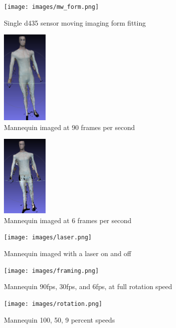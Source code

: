 \begin{figure}[!htb]
	\caption{Single d435 sensor moving imaging form fitting}
	\centering
	\texttt{[image: images/mw\_form.png]}
\end{figure}



\begin{figure}[!htb]
	\caption{Mannequin imaged at 90 frames per second}
	\centering
	\includegraphics[width=0.2\textwidth]{images/90fps_mannequin.png}
\end{figure}


\begin{figure}[!htb]
	\caption{Mannequin imaged at 6 frames per second}
	\centering
	\includegraphics[width=0.2\textwidth]{images/6fps_mannequin.png}
\end{figure}

\begin{figure}[!htb]
	\caption{Mannequin imaged with a laser on and off}
	\centering
	\texttt{[image: images/laser.png]}
\end{figure}


\begin{figure}[!htb]
	\caption{Mannequin 90fps, 30fps, and 6fps, at full rotation speed}
	\centering
	\texttt{[image: images/framing.png]}
\end{figure}


\begin{figure}[!htb]
	\caption{Mannequin 100, 50, 9 percent speeds}
	\centering
	\texttt{[image: images/rotation.png]}
\end{figure}

